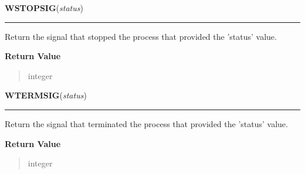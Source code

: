 \hspace{.8\funcindent}\begin{boxedminipage}{\funcwidth}

    \raggedright \textbf{WSTOPSIG}(\textit{status})

    \vspace{-1.5ex}

    \rule{\textwidth}{0.5\fboxrule}
\setlength{\parskip}{2ex}
    Return the signal that stopped the process that provided the 'status' 
    value.

\setlength{\parskip}{1ex}
      \textbf{Return Value}
    \vspace{-1ex}

      \begin{quote}
      integer

      \end{quote}

    \end{boxedminipage}

    \label{os:WTERMSIG}

    \vspace{0.5ex}

\hspace{.8\funcindent}\begin{boxedminipage}{\funcwidth}

    \raggedright \textbf{WTERMSIG}(\textit{status})

    \vspace{-1.5ex}

    \rule{\textwidth}{0.5\fboxrule}
\setlength{\parskip}{2ex}
    Return the signal that terminated the process that provided the 
    'status' value.

\setlength{\parskip}{1ex}
      \textbf{Return Value}
    \vspace{-1ex}

      \begin{quote}
      integer

      \end{quote}

    \end{boxedminipage}

    \label{os:abort}

    \vspace{0.5ex}

